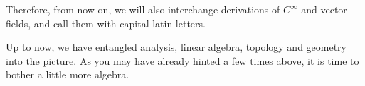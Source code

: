 Therefore, from now on, we will also interchange derivations of $C^\infty$ and vector fields, and call them with capital latin letters.

Up to now, we have entangled analysis, linear algebra, topology and geometry into the picture.
As you may have already hinted a few times above, it is time to bother a little more algebra.